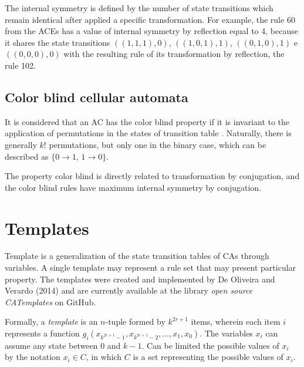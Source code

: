 \documentclass{llncs}
\begin{document}

The internal symmetry is defined by the number of state transitions which remain identical after applied a specific transformation. For example, the rule 60 from the ACEs has a value of internal symmetry by reflection equal to 4, because it shares the state transitions $((1,1,1),0)$, $((1,0,1),1)$, $((0,1,0),1)$ e $ ((0,0,0),0)$ with the resulting rule of its transformation by reflection, the rule 102.

\subsection{Color blind cellular automata}
It is considered that an AC has the color blind property if it is invariant to the application of permutations in the states of transition table \cite{salo2013color}. Naturally, there is generally $k!$ permutations, but only one in the binary case, which can be described as $\{0 \to 1 ,\, 1 \to 0\}$. 

The property color blind is directly related to transformation by conjugation, and the color blind rules have maximum internal symmetry by conjugation.

\section{Templates}
\label{sec:templates}
Template is a generalization of the state transition tables of CAs through variables. A single template may represent a rule set that may present particular property. The templates were created and implemented by De Oliveira and Verardo (2014) and are currently available at the library \textit{open source CATemplates} \cite{CATemplates} on GitHub.

Formally, a \textit{template} is an $n$-tuple formed by $k^{2r+1}$ items, wherein each item $i$ represents a function $g_i(x_{k^{2r+1}-1},x_{k^{2r+1}-2},\dots,x_1,x_0)$. The variables $x_i$ can assume any state between 0 and $k-1$. Can be limited the possible values of $x_i$ by the notation $x_i \in C$, in which $C$ is a set representing the possible values of $x_i$. %
\end{document}
